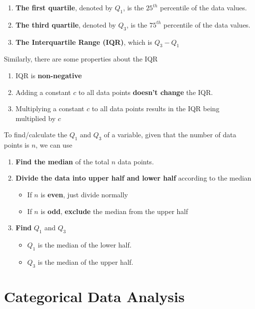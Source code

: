 \documentclass[math,code]{amznotes}
\theoremstyle{remark}
\begin{document}
\begin{enumerate}
    \item \textbf{The first quartile}, denoted by $Q_1$, is the $25^{th}$ percentile of the data values.
    \item \textbf{The third quartile}, denoted by $Q_3$, is the $75^{th}$ percentile of the data values.
    \item \textbf{The Interquartile Range (IQR)}, which is $Q_3-Q_1$
\end{enumerate}
Similarly, there are some properties about the IQR
\begin{enumerate}
    \item IQR is \textbf{non-negative}
    \item Adding a constant $c$ to all data points \textbf{doesn't change} the IQR.
    \item Multiplying a constant $c$ to all data points results in the IQR being multiplied by $c$
\end{enumerate}
To find/calculate the $Q_1$ and $Q_3$ of a variable, given that the number of data points is $n$, we can use
\begin{enumerate}
    \item \textbf{Find the median} of the total $n$ data points.
    \item \textbf{Divide the data into upper half and lower half} according to the median
    \begin{itemize}
        \item If $n$ is \textbf{even}, just divide normally
        \item If $n$ is \textbf{odd}, \textbf{exclude} the median from the upper half
    \end{itemize}
    \item \textbf{Find} $Q_1$ and $Q_3$
    \begin{itemize}
        \item $Q_1$ is the median of the lower half.
        \item $Q_3$ is the median of the upper half.
    \end{itemize}
\end{enumerate}

\chapter{Categorical Data Analysis}
\end{document}
